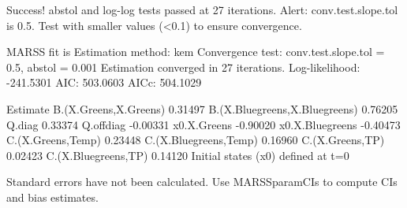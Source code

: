 \begin{Schunk}
\begin{Soutput}
Success! abstol and log-log tests passed at 27 iterations.
Alert: conv.test.slope.tol is 0.5.
Test with smaller values (<0.1) to ensure convergence.

MARSS fit is
Estimation method: kem 
Convergence test: conv.test.slope.tol = 0.5, abstol = 0.001
Estimation converged in 27 iterations. 
Log-likelihood: -241.5301 
AIC: 503.0603   AICc: 504.1029   
 
                              Estimate
B.(X.Greens,X.Greens)          0.31497
B.(X.Bluegreens,X.Bluegreens)  0.76205
Q.diag                         0.33374
Q.offdiag                     -0.00331
x0.X.Greens                   -0.90020
x0.X.Bluegreens               -0.40473
C.(X.Greens,Temp)              0.23448
C.(X.Bluegreens,Temp)          0.16960
C.(X.Greens,TP)                0.02423
C.(X.Bluegreens,TP)            0.14120
Initial states (x0) defined at t=0

Standard errors have not been calculated. 
Use MARSSparamCIs to compute CIs and bias estimates.
\end{Soutput}
\end{Schunk}
